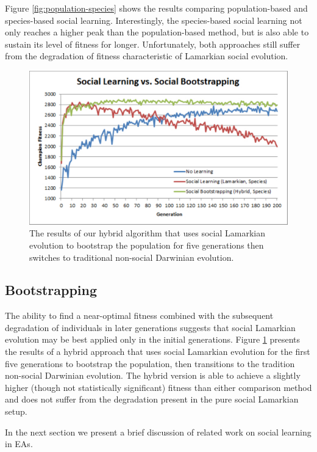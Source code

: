 \documentclass{acm_proc_article-sp}
\begin{document}
Figure \ref{fig:population-species} shows the results comparing population-based and species-based social learning. Interestingly, the species-based social learning not only reaches a higher peak than the population-based method, but is also able to sustain its level of fitness for longer. Unfortunately, both approaches still suffer from the degradation of fitness characteristic of Lamarkian social evolution.

\begin{figure}
  \centering
    \includegraphics[scale=.35]{learning_bootstrapping.pdf}
  \caption{The results of our hybrid algorithm that uses social Lamarkian evolution to bootstrap the population for five generations then switches to traditional non-social Darwinian evolution.}
  \label{fig:learning-bootstrapping}
\end{figure}

\subsection*{Bootstrapping}
The ability to find a near-optimal fitness combined with the subsequent degradation of individuals in later generations suggests that social Lamarkian evolution may be best applied only in the initial generations. Figure \ref{fig:learning-bootstrapping} presents the results of a hybrid approach that uses social Lamarkian evolution for the first five generations to bootstrap the population, then transitions to the tradition non-social Darwinian evolution. The hybrid version is able to achieve a slightly higher (though not statistically significant) fitness than either comparison method and does not suffer from the degradation present in the pure social Lamarkian setup.

In the next section we present a brief discussion of related work on social learning in EAs.
\end{document}
